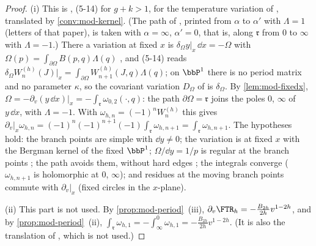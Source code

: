 \begin{proof}
(i) This is \cite[Thm.~5.1]{Eynard:2007kz}, (5-14) for $g+k>1$, for the temperature variation of \cite[\S5.3, (5-27)--(5-30)]{Eynard:2007kz}, translated by \cref{conv:mod-kernel}. (The path of \cite[(5-27)]{Eynard:2007kz}, printed from $\alpha$ to $\alpha'$ with $\Lambda=1$ (letters of that paper), is taken with $\alpha=\infty$, $\alpha'=0$, that is, along $\mathfrak r$ from $0$ to $\infty$ with $\Lambda=-1$.) There a variation at fixed $x$ is $\delta_\Omega y|_x\,\dd x=-\Omega$ \cite[(5-1)]{Eynard:2007kz} with $\Omega(p)=\int_{\partial\Omega}B(p,q)\Lambda(q)$ \cite[(5-13)]{Eynard:2007kz}, and (5-14) reads $\delta_\Omega W^{(h)}_n(J)|_{x}=\int_{\partial\Omega}W^{(h)}_{n+1}(J,q)\Lambda(q)$; on $\bbP^1$ there is no period matrix and no parameter $\kappa$, so the covariant variation $D_\Omega$ of \cite[Thm.~5.1]{Eynard:2007kz} is $\delta_\Omega$. By \cref{lem:mod-fixedx}, $\Omega=-\partial_v(y\,\dd x)|_x=-\int_{\mathfrak r}\omega_{0,2}(\cdot,q)$: the path $\partial\Omega=\mathfrak r$ joins the poles $0$, $\infty$ of $y\,\dd x$, with $\Lambda=-1$. With $\omega_{h,n}=(-1)^nW^{(h)}_n$ this gives $\partial_v|_x\omega_{h,n}=(-1)^{n}(-1)^{n+1}(-1)\int_{\mathfrak r}\omega_{h,n+1}=\int_{\mathfrak r}\omega_{h,n+1}$. The hypotheses hold: the branch points are simple with $\dd y\neq 0$; the variation is at fixed $x$ with the Bergman kernel of the fixed $\bbP^1$; $\Omega/\dd y=1/p$ is regular at the branch points \cite[the assumption before (5-4)]{Eynard:2007kz}; the path avoids them, without hard edges \cite[(5-13), footnote~8]{Eynard:2007kz}; the integrals converge ($\omega_{h,n+1}$ is holomorphic at $0$, $\infty$); and residues at the moving branch points commute with $\partial_v|_x$ (fixed circles in the $x$-plane).

(ii) This part is not used. By \cref{prop:mod-period}~(iii), $\partial_v\FTR_h=-\frac{B_{2h}}{2h}v^{1-2h}$, and by \cref{prop:mod-period}~(ii), $\int_{\mathfrak r}\omega_{h,1}=-\int_\infty^0\omega_{h,1}=-\frac{B_{2h}}{2h}v^{1-2h}$. (It is also the translation of \cite[(5-15)]{Eynard:2007kz}, which is not used.)
\end{proof}

